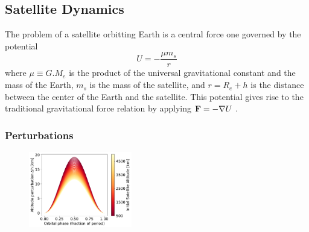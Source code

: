 
\subsection{Satellite Dynamics}

The problem of a satellite orbitting Earth is a central force one governed by the potential
\begin{equation}
    U = - \frac{\mu m_s}{r}
\end{equation}
where $\mu \equiv G . M_e$ is the product of the universal gravitational constant and the mass of the Earth, $m_s$ is the mass of the satellite, and $r = R_e + h$ is the distance between the center of the Earth and the satellite. This potential gives rise to the traditional gravitational force relation by applying $\vb{F} = -\nabla U$ \cite{curtis2005}.

\subsubsection{Perturbations}

\begin{figure}
    \centering
    \vspace{-.1\baselineskip}
    \includegraphics[width=0.4\textwidth]{figures/delta-h.pdf}
    \caption{}
    \label{fig:delta-h}
\end{figure}

